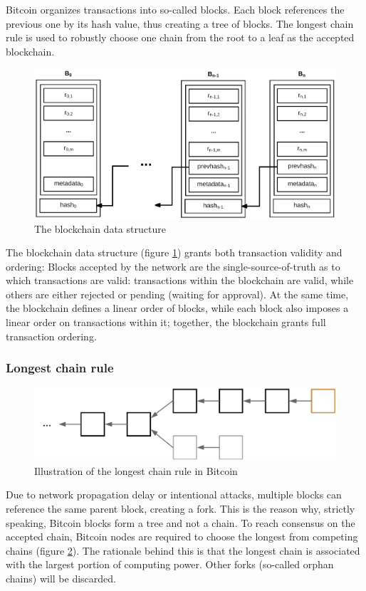 \documentclass[12pt]{article}
\begin{document}
    Bitcoin organizes transactions into so-called blocks. Each block references the previous one by its hash value, thus creating a tree of blocks. The longest chain rule is used to robustly choose one chain from the root to a leaf as the accepted blockchain.

\begin{figure}[h!]
\centering
\includegraphics[width=0.7\columnwidth]{images/blockchain.png}
\caption{The blockchain data structure \cite{Garam}}
\label{fig:blockchain}
\end{figure}

    The blockchain data structure (figure \ref{fig:blockchain}) grants both transaction validity and ordering: Blocks accepted by the network are the single-source-of-truth as to which transactions are valid: transactions within the blockchain are valid, while others are either rejected or pending (waiting for approval). At the same time, the blockchain defines a linear order of blocks, while each block also imposes a linear order on transactions within it; together, the blockchain grants full transaction ordering.

\subsubsection{Longest chain rule}

\begin{figure}[h!]
\centering
\includegraphics[width=0.7\columnwidth]{images/longest-chain.png}
\caption{Illustration of the longest chain rule in Bitcoin}
\label{fig:longest-chain}
\end{figure}

    Due to network propagation delay or intentional attacks, multiple blocks can reference the same parent block, creating a fork. This is the reason why, strictly speaking, Bitcoin blocks form a tree and not a chain. To reach consensus on the accepted chain, Bitcoin nodes are required to choose the longest from competing chains (figure \ref{fig:longest-chain}). The rationale behind this is that the longest chain is associated with the largest portion of computing power. Other forks (so-called orphan chains) will be discarded.
\end{document}
